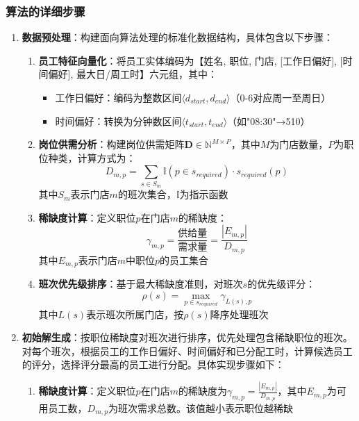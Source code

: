 \documentclass{ctexart}
\begin{document}
\subsubsection{算法的详细步骤}
\begin{enumerate}
    \item \textbf{数据预处理}：构建面向算法处理的标准化数据结构，具体包含以下步骤：
    \begin{enumerate}
        \item \textbf{员工特征向量化}：将员工实体编码为【姓名, 职位, 门店, [工作日偏好], [时间偏好], 最大日/周工时】六元组，其中：
        \begin{itemize}
            \item 工作日偏好：编码为整数区间$\langle d_{start}, d_{end} \rangle$（0-6对应周一至周日）
            \item 时间偏好：转换为分钟数区间$\langle t_{start}, t_{end} \rangle$（如"08:30"→510）
        \end{itemize}
        
        \item \textbf{岗位供需分析}：构建岗位供需矩阵$\mathbf{D} \in \mathbb{N}^{M \times P}$，其中$M$为门店数量，$P$为职位种类，计算方式为：
        \begin{equation}
            D_{m,p} = \sum_{s \in S_m} \mathbb{I}(p \in s_{required}) \cdot s_{required}(p)
        \end{equation}
        其中$S_m$表示门店$m$的班次集合，$\mathbb{I}$为指示函数
        
        \item \textbf{稀缺度计算}：定义职位$p$在门店$m$的稀缺度：
        \begin{equation}
            \gamma_{m,p} = \frac{\text{供给量}}{\text{需求量}} = \frac{|E_{m,p}|}{D_{m,p}}
        \end{equation}
        其中$E_{m,p}$表示门店$m$中职位$p$的员工集合
        
        \item \textbf{班次优先级排序}：基于最大稀缺度准则，对班次$s$的优先级评分：
        \begin{equation}
            \rho(s) = \max_{p \in s_{required}} \gamma_{L(s),p}
        \end{equation}
        其中$L(s)$表示班次所属门店，按$\rho(s)$降序处理班次
    \end{enumerate}
    
    \item \textbf{初始解生成}：按职位稀缺度对班次进行排序，优先处理包含稀缺职位的班次。对每个班次，根据员工的工作日偏好、时间偏好和已分配工时，计算候选员工的评分，选择评分最高的员工进行分配。具体实现步骤如下：
    \begin{enumerate}
        \item \textbf{稀缺度计算}：定义职位$p$在门店$m$的稀缺度为$\gamma_{m,p}=\frac{|E_{m,p}|}{D_{m,p}}$，其中$E_{m,p}$为可用员工数，$D_{m,p}$为班次需求总数。该值越小表示职位越稀缺
        

\end{enumerate}
\end{enumerate}
\end{document}

